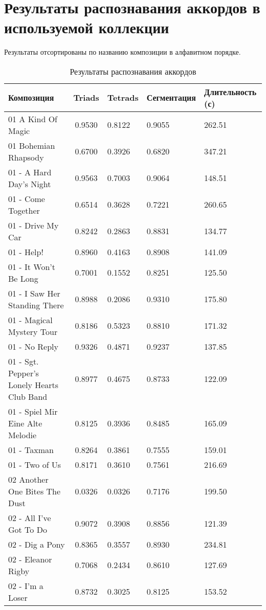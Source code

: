 \appendix
\chapter{Результаты распознавания аккордов в используемой коллекции}
\label{AppendixA}

Результаты отсортированы по названию композиции в алфавитном порядке.

\fontsize{10pt}{10pt}\selectfont
\begin{longtable}[c]{|p{8cm}|c|l|l|l|}
\caption{Результаты распознавания аккордов}\label{Namelists}
\\
\hline
Композиция & Triads & Tetrads & Сегментация & Длительность (с) \\
\hline
01 A Kind Of Magic & 0.9530 & 0.8122 & 0.9055 & 262.51 \\
01 Bohemian Rhapsody & 0.6700 & 0.3926 & 0.6820 & 347.21 \\
01 - A Hard Day's Night & 0.9563 & 0.7003 & 0.9064 & 148.51 \\
01 - Come Together & 0.6514 & 0.3628 & 0.7221 & 260.65 \\
01 - Drive My Car & 0.8242 & 0.2863 & 0.8831 & 134.77 \\
01 - Help! & 0.8960 & 0.4163 & 0.8908 & 141.09 \\
01 - It Won't Be Long & 0.7001 & 0.1552 & 0.8251 & 125.50 \\
01 - I Saw Her Standing There & 0.8988 & 0.2086 & 0.9310 & 175.80 \\
01 - Magical Mystery Tour & 0.8186 & 0.5323 & 0.8810 & 171.32 \\
01 - No Reply & 0.9326 & 0.4871 & 0.9237 & 137.85 \\
01 - Sgt. Pepper's Lonely Hearts Club Band & 0.8977 & 0.4675 & 0.8733 & 122.09 \\
01 - Spiel Mir Eine Alte Melodie & 0.8125 & 0.3936 & 0.8485 & 165.09 \\
01 - Taxman & 0.8264 & 0.3861 & 0.7555 & 159.01 \\
01 - Two of Us & 0.8171 & 0.3610 & 0.7561 & 216.69 \\
02 Another One Bites The Dust & 0.0326 & 0.0326 & 0.7176 & 199.50 \\
02 - All I've Got To Do & 0.9072 & 0.3908 & 0.8856 & 121.39 \\
02 - Dig a Pony & 0.8365 & 0.3557 & 0.8930 & 234.81 \\
02 - Eleanor Rigby & 0.7068 & 0.2434 & 0.8610 & 127.69 \\
02 - I'm a Loser & 0.8732 & 0.3025 & 0.8125 & 153.52 \\

\end{longtable}
